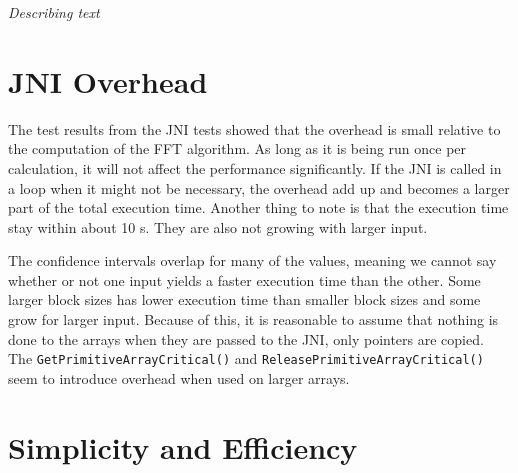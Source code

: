 \textit{Describing text}

\section{JNI Overhead}
The test results from the JNI tests showed that the overhead is small relative to the computation of the FFT algorithm. As long as it is being run once per calculation, it will not affect the performance significantly. If the JNI is called in a loop when it might not be necessary, the overhead add up and becomes a larger part of the total execution time. Another thing to note is that the execution time stay within about 10 \textmu s. They are also not growing with larger input.

The confidence intervals overlap for many of the values, meaning we cannot say whether or not one input yields a faster execution time than the other. Some larger block sizes has lower execution time than smaller block sizes and some grow for larger input. Because of this, it is reasonable to assume that nothing is done to the arrays when they are passed to the JNI, only pointers are copied. The \texttt{GetPrimitiveArrayCritical()} and \texttt{ReleasePrimitiveArrayCritical()} seem to introduce overhead when used on larger arrays. %


\section{Simplicity and Efficiency}







